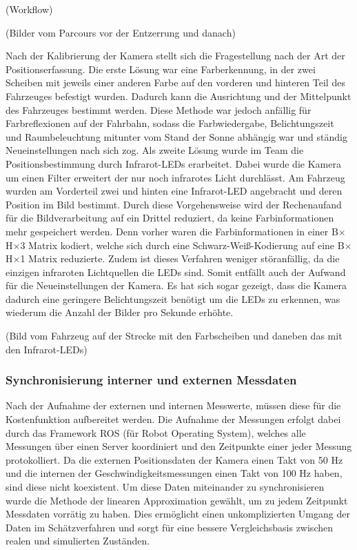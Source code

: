(Workflow)    

(Bilder vom Parcours vor der Entzerrung und danach)

Nach der Kalibrierung der Kamera stellt sich die Fragestellung nach der Art der Positionserfassung. Die erste Lösung war eine Farberkennung, in der zwei Scheiben mit jeweils einer anderen Farbe auf den vorderen und hinteren Teil des Fahrzeuges befestigt wurden. Dadurch kann die Ausrichtung und der Mittelpunkt des Fahrzeuges bestimmt werden. Diese Methode war jedoch anfällig für Farbreflexionen auf der Fahrbahn, sodass die Farbwiedergabe, Belichtungszeit und Raumbeleuchtung mitunter vom Stand der Sonne abhängig war und ständig Neueinstellungen nach sich zog. Als zweite Lösung wurde im Team die Positionsbestimmung durch Infrarot-LEDs erarbeitet. Dabei wurde die Kamera um einen Filter erweitert der nur noch infrarotes Licht durchlässt. Am Fahrzeug wurden am Vorderteil zwei und hinten eine Infrarot-LED angebracht und deren Position im Bild bestimmt. Durch diese Vorgehensweise wird der Rechenaufand für die Bildverarbeitung auf ein Drittel reduziert, da keine Farbinformationen mehr gespeichert werden. Denn vorher waren die Farbinformationen in einer B$\times$H$\times$3 Matrix kodiert, welche sich durch eine Schwarz-Weiß-Kodierung auf eine B$\times$H$\times$1 Matrix reduzierte. Zudem ist dieses Verfahren weniger störanfällig, da die einzigen infraroten Lichtquellen die LEDs sind. Somit entfällt auch der Aufwand für die Neueinstellungen der Kamera. Es hat sich sogar gezeigt, dass die Kamera dadurch eine geringere Belichtungszeit benötigt um die LEDs zu erkennen, was wiederum die Anzahl der Bilder pro Sekunde erhöhte.  

(Bild vom Fahrzeug auf der Strecke mit den Farbscheiben und daneben das mit den Infrarot-LEDs)  

\subsubsection{Synchronisierung interner und externen Messdaten}
Nach der Aufnahme der externen und internen Messwerte, müssen diese für die Kostenfunktion aufbereitet werden. Die Aufnahme der Messungen erfolgt dabei durch das Framework ROS (für Robot Operating System), welches alle Messungen über einen Server koordiniert und den Zeitpunkte einer jeder Messung protokolliert. Da die externen Positionsdaten der Kamera einen Takt von 50 Hz und die internen der Geschwindigkeitsmessungen einen Takt von 100 Hz haben, sind diese nicht koexistent. Um diese Daten miteinander zu synchronisieren wurde die Methode der linearen Approximation gewählt, um zu jedem Zeitpunkt Messdaten vorrätig zu haben. Dies ermöglicht einen unkomplizierten Umgang der Daten im Schätzverfahren und sorgt für eine bessere Vergleichsbasis zwischen realen und simulierten Zuständen. 

